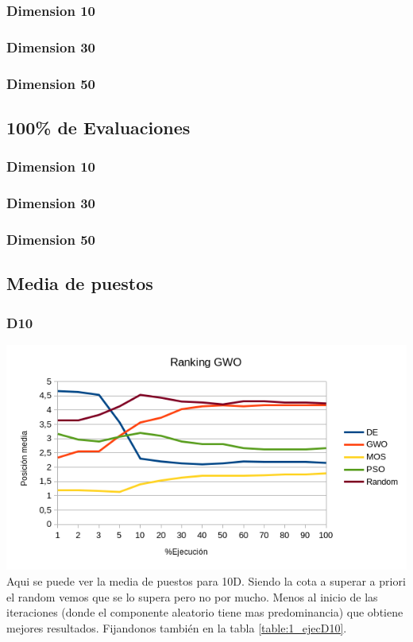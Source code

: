 \documentclass[a4paper, 12.5pt]{report}
\begin{document}
\subsubsection*{Dimension 10}

\subsubsection*{Dimension 30}

\subsubsection*{Dimension 50}



\subsection{100\% de Evaluaciones}


\subsubsection*{Dimension 10}

\subsubsection*{Dimension 30}

\subsubsection*{Dimension 50}



\subsection{Media de puestos}

\subsubsection*{D10}

\includegraphics*[width=1\textwidth]{Resultados/basico/d10/Grafico_puestos.png} \label{img:ranking_D10}
Aqui se puede ver la media de puestos para 10D. Siendo la cota a superar a priori el random vemos que se lo supera pero no por mucho. Menos al inicio de las iteraciones (donde el componente aleatorio tiene mas predominancia) que obtiene mejores resultados. Fijandonos también en la tabla \ref{table:1_ejecD10}.
\end{document}
